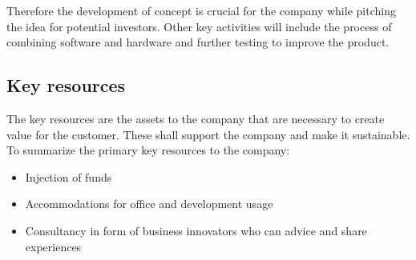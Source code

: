 Therefore the development of concept is crucial for the company while pitching the idea for potential investors. Other key activities will include the process of combining software and hardware and further testing to improve the product. 

\subsection{Key resources}
The key resources are the assets to the company that are necessary to create value for the customer. These shall support the company and make it sustainable.
To summarize the primary key resources to the company:
\begin{itemize}
\item Injection of funds
\item Accommodations for office and development usage
\item Consultancy in form of business innovators who can advice and share experiences
\end{itemize}

